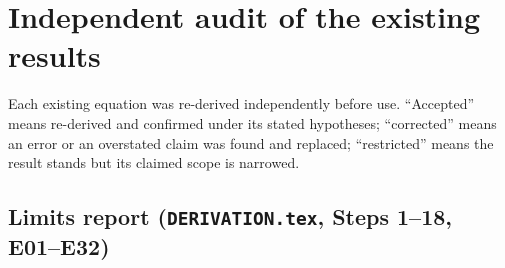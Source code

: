 \section{Independent audit of the existing results}\label{sec:audit}
Each existing equation was re-derived independently before use. ``Accepted'' means re-derived
and confirmed under its stated hypotheses; ``corrected'' means an error or an overstated claim
was found and replaced; ``restricted'' means the result stands but its claimed scope is narrowed.

\subsection{Limits report (\texttt{DERIVATION.tex}, Steps 1--18, E01--E32)}
